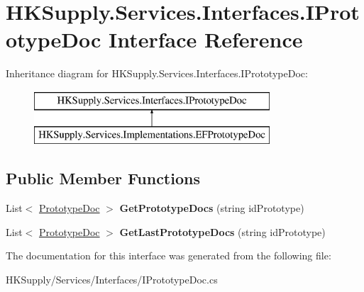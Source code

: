 \hypertarget{interface_h_k_supply_1_1_services_1_1_interfaces_1_1_i_prototype_doc}{}\section{H\+K\+Supply.\+Services.\+Interfaces.\+I\+Prototype\+Doc Interface Reference}
\label{interface_h_k_supply_1_1_services_1_1_interfaces_1_1_i_prototype_doc}
Inheritance diagram for H\+K\+Supply.\+Services.\+Interfaces.\+I\+Prototype\+Doc\+:\begin{figure}[H]
\begin{center}
\leavevmode
\includegraphics[height=2.000000cm]{interface_h_k_supply_1_1_services_1_1_interfaces_1_1_i_prototype_doc}
\end{center}
\end{figure}
\subsection*{Public Member Functions}
\begin{DoxyCompactItemize}
\item 
\mbox{\label{interface_h_k_supply_1_1_services_1_1_interfaces_1_1_i_prototype_doc_af43d2c25cfd45b2d0900c618480d641d}} 
List$<$ \mbox{\hyperlink{class_h_k_supply_1_1_models_1_1_prototype_doc}{Prototype\+Doc}} $>$ {\bfseries Get\+Prototype\+Docs} (string id\+Prototype)
\item 
\mbox{\label{interface_h_k_supply_1_1_services_1_1_interfaces_1_1_i_prototype_doc_a8f87f6c9a9d79eaf1e02e4587b7f2a41}} 
List$<$ \mbox{\hyperlink{class_h_k_supply_1_1_models_1_1_prototype_doc}{Prototype\+Doc}} $>$ {\bfseries Get\+Last\+Prototype\+Docs} (string id\+Prototype)
\end{DoxyCompactItemize}


The documentation for this interface was generated from the following file\+:\begin{DoxyCompactItemize}
\item 
H\+K\+Supply/\+Services/\+Interfaces/I\+Prototype\+Doc.\+cs\end{DoxyCompactItemize}
